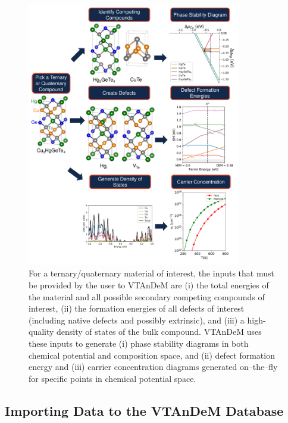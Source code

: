 \documentclass[%
 reprint,
 amsmath,amssymb,
 aps,
]{revtex4-1}
\begin{document}
\begin{figure}
\centering
\includegraphics[width=0.835\textwidth]{Workflow_v6.pdf}
\caption{For a ternary/quaternary material of interest, the inputs that must be provided by the user to VTAnDeM are (i) the total energies of the material and all possible secondary competing compounds of interest, (ii) the formation energies of all defects of interest (including native defects and possibly extrinsic), and (iii) a high-quality density of states of the bulk compound. VTAnDeM uses these inputs to generate (i) phase stability diagrams in both chemical potential and composition space, and (ii) defect formation energy and (iii) carrier concentration diagrams generated on--the--fly for specific points in chemical potential space.}
\label{Figure:Workflow}
\end{figure}


\subsection{Importing Data to the VTAnDeM Database} \label{Subsection:Importing_Data}
\end{document}
